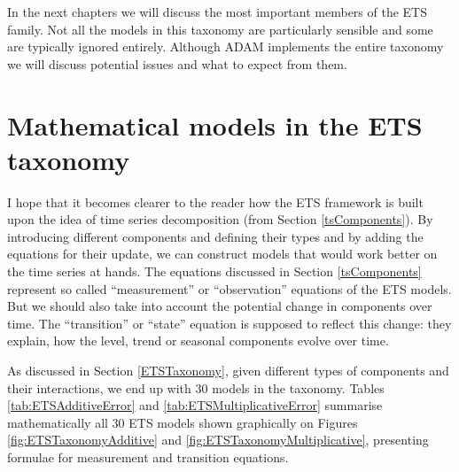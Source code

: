 \documentclass[
]{book}
\theoremstyle{definition}
\theoremstyle{definition}
\theoremstyle{definition}
\theoremstyle{definition}
\theoremstyle{remark}
\begin{document}
In the next chapters we will discuss the most important members of the ETS family. Not all the models in this taxonomy are particularly sensible and some are typically ignored entirely. Although ADAM implements the entire taxonomy we will discuss potential issues and what to expect from them.

\hypertarget{ETSTaxonomyMaths}{%
\section{Mathematical models in the ETS taxonomy}\label{ETSTaxonomyMaths}}

I hope that it becomes clearer to the reader how the ETS framework is built upon the idea of time series decomposition (from Section \ref{tsComponents}). By introducing different components and defining their types and by adding the equations for their update, we can construct models that would work better on the time series at hands. The equations discussed in Section \ref{tsComponents} represent so called ``measurement'' or ``observation'' equations of the ETS models. But we should also take into account the potential change in components over time. The ``transition'' or ``state'' equation is supposed to reflect this change: they explain, how the level, trend or seasonal components evolve over time.

As discussed in Section \ref{ETSTaxonomy}, given different types of components and their interactions, we end up with 30 models in the taxonomy. Tables \ref{tab:ETSAdditiveError} and \ref{tab:ETSMultiplicativeError} summarise mathematically all 30 ETS models shown graphically on Figures \ref{fig:ETSTaxonomyAdditive} and \ref{fig:ETSTaxonomyMultiplicative}, presenting formulae for measurement and transition equations.
\end{document}

